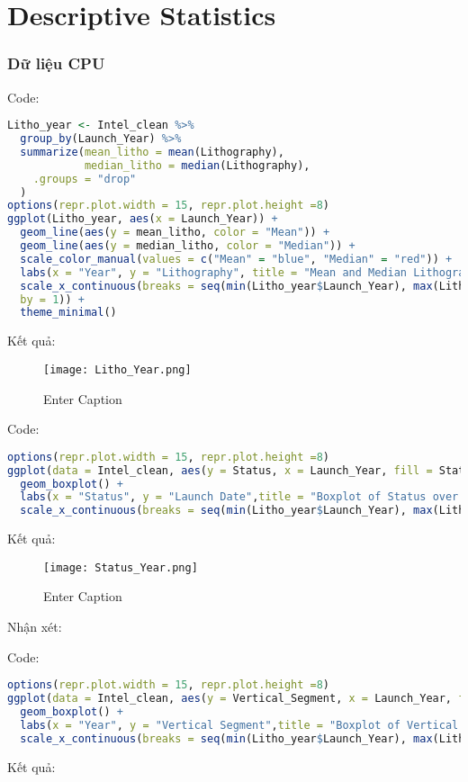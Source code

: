 \chapter{Descriptive Statistics}
\subsection{Dữ liệu CPU}
Code:
\begin{lstlisting}[language=R]
Litho_year <- Intel_clean %>% 
  group_by(Launch_Year) %>%
  summarize(mean_litho = mean(Lithography),
            median_litho = median(Lithography),
    .groups = "drop"
  )
options(repr.plot.width = 15, repr.plot.height =8)
ggplot(Litho_year, aes(x = Launch_Year)) +
  geom_line(aes(y = mean_litho, color = "Mean")) +
  geom_line(aes(y = median_litho, color = "Median")) +
  scale_color_manual(values = c("Mean" = "blue", "Median" = "red")) +
  labs(x = "Year", y = "Lithography", title = "Mean and Median Lithography by Year") +
  scale_x_continuous(breaks = seq(min(Litho_year$Launch_Year), max(Litho_year$Launch_Year),
  by = 1)) +
  theme_minimal()
\end{lstlisting}
Kết quả:

\begin{figure}[h]
  \centering
  \texttt{[image: Litho\_Year.png]}
  \vspace{1pt} %
  \caption{Enter Caption}
  \label{fig:enter-label}
\end{figure}

\newpage
Code:
\begin{lstlisting}[language=R]
options(repr.plot.width = 15, repr.plot.height =8) 
ggplot(data = Intel_clean, aes(y = Status, x = Launch_Year, fill = Status)) +
  geom_boxplot() +
  labs(x = "Status", y = "Launch Date",title = "Boxplot of Status over Year") +
  scale_x_continuous(breaks = seq(min(Litho_year$Launch_Year), max(Litho_year$Launch_Year), by = 1))
\end{lstlisting}
Kết quả:

\begin{figure}[h]
  \centering
  \texttt{[image: Status\_Year.png]}
  \vspace{1pt}
  \caption{Enter Caption}
  \label{fig:enter-label}
\end{figure}

Nhận xét:

\newpage
Code:
\begin{lstlisting}[language=R]
options(repr.plot.width = 15, repr.plot.height =8) 
ggplot(data = Intel_clean, aes(y = Vertical_Segment, x = Launch_Year, fill = Vertical_Segment)) +
  geom_boxplot() +
  labs(x = "Year", y = "Vertical Segment",title = "Boxplot of Vertical Segment over Year") +
  scale_x_continuous(breaks = seq(min(Litho_year$Launch_Year), max(Litho_year$Launch_Year), by = 1))
\end{lstlisting}
Kết quả:

